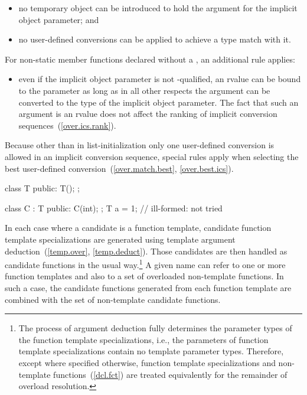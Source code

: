 \begin{itemize}
\item
no temporary object can be introduced to hold the argument
for the implicit object parameter; and
\item
no user-defined conversions can be applied to achieve a type
match with it.
\end{itemize}

%
For non-static member functions declared without a ,
an additional rule applies:

\begin{itemize}
\item
even if the implicit object parameter is not
-qualified,
an rvalue can be bound to the parameter
as long as in all other respects the argument can be
converted to the type of the implicit object parameter.
\enternote The fact that such an argument is an rvalue does not
affect the ranking of implicit conversion sequences~(\ref{over.ics.rank}).
\exitnote
\end{itemize}

\pnum
Because other than in list-initialization only one user-defined conversion
is allowed
in an
implicit conversion sequence, special rules apply when selecting
the best user-defined conversion~(\ref{over.match.best},
\ref{over.best.ics}).
\enterexample

\begin{codeblock}
class T {
public:
  T();
};

class C : T {
public:
  C(int);
};
T a = 1;            // ill-formed:  not tried
\end{codeblock}
\exitexample

\pnum
In each case where a candidate is a function template, candidate
function template specializations
are generated using template argument deduction~(\ref{temp.over},
\ref{temp.deduct}).
Those candidates are then handled as candidate
functions in the usual way.\footnote{The process of argument deduction fully
determines the parameter types of
the
function template specializations,
i.e., the parameters of
function template specializations
contain
no template parameter types.
Therefore, except where specified otherwise,
function template specializations
and non-template functions~(\ref{dcl.fct}) are treated equivalently
for the remainder of overload resolution.}
A given name can refer to one or more function templates and also
to a set of overloaded non-template functions.
In such a case, the
candidate functions generated from each function template are combined
with the set of non-template candidate functions.

